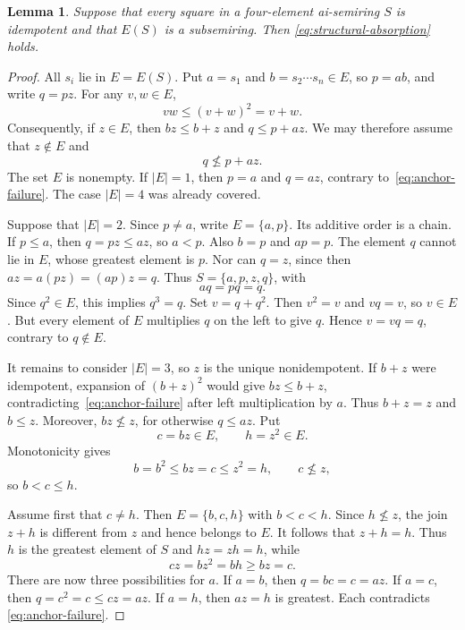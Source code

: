 \documentclass[11pt,reqno]{amsart}
\newtheorem{lemma}[theorem]{Lemma}
\theoremstyle{remark}
\numberwithin{equation}{section}
\begin{document}
\begin{lemma}\label{lem:closed-idempotents-absorption}
Suppose that every square in a four-element ai-semiring $S$ is
idempotent and that $E(S)$ is a subsemiring. Then
\eqref{eq:structural-absorption} holds.
\end{lemma}
\begin{proof}
All $s_i$ lie in $E=E(S)$. Put $a=s_1$ and
$b=s_2\cdots s_n\in E$, so $p=ab$, and write $q=pz$.
For any $v,w\in E$,
\begin{equation}\label{eq:band-order}
vw\leq(v+w)^2=v+w.
\end{equation}
Consequently, if $z\in E$, then $bz\leq b+z$ and
$q\leq p+az$. We may therefore assume that $z\notin E$ and
\begin{equation}\label{eq:anchor-failure}
q\not\leq p+az.
\end{equation}
The set $E$ is nonempty. If $|E|=1$, then $p=a$ and $q=az$, contrary
to~\eqref{eq:anchor-failure}. The case $|E|=4$ was already covered.

Suppose that $|E|=2$. Since $p\ne a$, write $E=\{a,p\}$.
Its additive order is a chain. If $p\leq a$, then $q=pz\leq az$,
so $a<p$. Also $b=p$ and $ap=p$. The element $q$ cannot lie in $E$,
whose greatest element is $p$. Nor can $q=z$, since then
$az=a(pz)=(ap)z=q$. Thus $S=\{a,p,z,q\}$, with
\[
aq=pq=q.
\]
Since $q^2\in E$, this implies $q^3=q$. Set $v=q+q^2$.
Then $v^2=v$ and $vq=v$, so $v\in E$. But every element of $E$
multiplies $q$ on the left to give $q$. Hence $v=vq=q$, contrary
to $q\notin E$.

It remains to consider $|E|=3$, so $z$ is the unique nonidempotent.
If $b+z$ were idempotent, expansion of $(b+z)^2$ would give
$bz\leq b+z$, contradicting~\eqref{eq:anchor-failure} after left
multiplication by $a$. Thus $b+z=z$ and $b\leq z$. Moreover,
$bz\not\leq z$, for otherwise $q\leq az$. Put
\[
c=bz\in E,\qquad h=z^2\in E.
\]
Monotonicity gives
\begin{equation}\label{eq:bch}
b=b^2\leq bz=c\leq z^2=h,\qquad c\not\leq z,
\end{equation}
so $b<c\leq h$.

Assume first that $c\ne h$. Then $E=\{b,c,h\}$ with $b<c<h$.
Since $h\not\leq z$, the join $z+h$ is different from $z$ and hence
belongs to $E$. It follows that $z+h=h$. Thus $h$ is the greatest
element of $S$ and $hz=zh=h$, while
\[
cz=bz^2=bh\geq bz=c.
\]
There are now three possibilities for $a$. If $a=b$, then
$q=bc=c=az$. If $a=c$, then $q=c^2=c\leq cz=az$.
If $a=h$, then $az=h$ is greatest. Each contradicts
\eqref{eq:anchor-failure}.


\end{proof}
\end{document}

